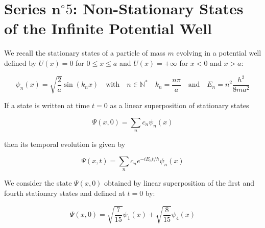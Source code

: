 \documentclass{article}
\begin{document}
\newpage
    \section*{Series $\mathbf{n}^{\circ} 5$: Non-Stationary States of the Infinite Potential Well}

    We recall the stationary states of a particle of mass $m$ evolving in a potential well defined by $U(x) = 0$ for $0 \leq x \leq a$ and $U(x) = +\infty$ for $x < 0$ and $x > a$:

    $$
    \psi_{n}(x) = \sqrt{\frac{2}{a}} \sin \left(k_{n} x\right) \quad \text{with} \quad n \in \mathbb{N}^{*} \quad k_{n} = \frac{n \pi}{a} \quad \text{and} \quad E_{n} = n^{2} \frac{h^{2}}{8 m a^{2}}
    $$

    If a state is written at time $t=0$ as a linear superposition of stationary states

    $$
    \Psi(x, 0) = \sum_{n} c_{n} \psi_{n}(x)
    $$

    then its temporal evolution is given by

    $$
    \Psi(x, t) = \sum_{n} c_{n} e^{-i E_{n} t / \hbar} \psi_{n}(x)
    $$

    We consider the state $\Psi(x, 0)$ obtained by linear superposition of the first and fourth stationary states and defined at $t=0$ by:

    $$
    \Psi(x, 0) = \sqrt{\frac{7}{15}} \psi_{1}(x) + \sqrt{\frac{8}{15}} \psi_{4}(x)
    $$
\end{document}
